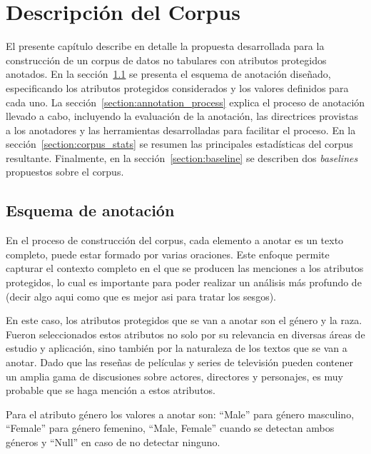 \chapter{Descripci\'on del Corpus}\label{chapter:proposal}
El presente cap\'itulo describe en detalle la propuesta desarrollada para la construcci\'on de un corpus de datos no tabulares con 
atributos protegidos anotados. En la secci\'on~\ref{section:annotation_scheme} se presenta el esquema de 
anotaci\'on dise\~nado, especificando los atributos protegidos considerados y los valores definidos para cada uno. La
secci\'on~\ref{section:annotation_process} explica el proceso de anotaci\'on llevado a cabo, incluyendo la evaluaci\'on de 
la anotaci\'on, las directrices provistas a los anotadores y las herramientas desarrolladas para facilitar el proceso. En la
secci\'on~\ref{section:corpus_stats} se resumen las principales estad\'isticas del corpus resultante. Finalmente, en la 
secci\'on~\ref{section:baseline} se describen dos \emph{baselines} propuestos sobre el corpus.

\section{Esquema de anotaci\'on}\label{section:annotation_scheme}
En el proceso de construcci\'on del corpus, cada elemento a anotar es un texto completo, puede estar formado por varias oraciones. 
Este enfoque permite capturar el contexto completo en el que se producen las menciones a los atributos protegidos, 
lo cual es importante para poder realizar un an\'alisis m\'as profundo de (decir algo aqui como que es mejor asi para tratar los sesgos).

En este caso, los atributos protegidos que se van a anotar son el g\'enero y la raza.
Fueron seleccionados estos atributos no solo por su relevancia en diversas \'areas de estudio y aplicaci\'on, sino tambi\'en 
por la naturaleza de los textos que se van a anotar. Dado que las rese\~nas de pel\'iculas y series de televisi\'on
pueden contener un amplia gama de discusiones sobre actores, directores y personajes, es muy probable que se haga menci\'on a 
estos atributos.

Para el atributo g\'enero los valores a anotar son: ``Male'' para g\'enero masculino, ``Female'' para g\'enero femenino, 
``Male, Female'' cuando se detectan ambos g\'eneros y ``Null'' en caso de no detectar ninguno.

